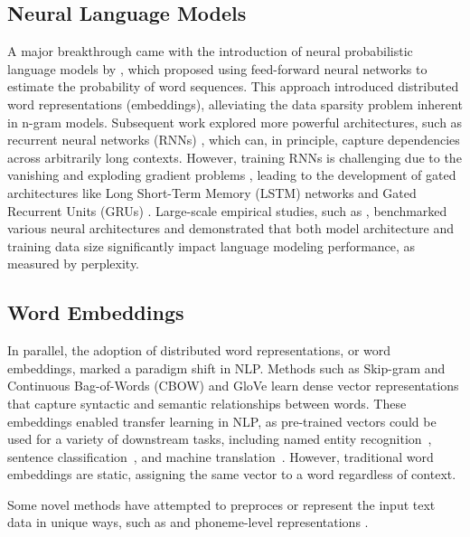 \subsection{Neural Language Models}

A major breakthrough came with the introduction of neural probabilistic language models by \cite{bengio2003neural}, which proposed using feed-forward neural networks to estimate the probability of word sequences. This approach introduced distributed word representations (embeddings), alleviating the data sparsity problem inherent in n-gram models. Subsequent work explored more powerful architectures, such as recurrent neural networks (RNNs) \citep{mikolov2010recurrent}, which can, in principle, capture dependencies across arbitrarily long contexts. However, training RNNs is challenging due to the vanishing and exploding gradient problems \citep{bengio1994learning}, leading to the development of gated architectures like Long Short-Term Memory (LSTM) networks \citep{hochreiter1997lstm} and Gated Recurrent Units (GRUs) \citep{cho2014gru}.
Large-scale empirical studies, such as \cite{jozefowicz2016exploring}, benchmarked various neural architectures and demonstrated that both model architecture and training data size significantly impact language modeling performance, as measured by perplexity.
\subsection{Word Embeddings}
In parallel, the adoption of distributed word representations, or word embeddings, marked a paradigm shift in NLP. Methods such as Skip-gram and Continuous Bag-of-Words (CBOW) \citep{mikolov2013efficient, mikolov2013distributed} and GloVe \citep{pennington2014glove} learn dense vector representations that capture syntactic and semantic relationships between words. These embeddings enabled transfer learning in NLP, as pre-trained vectors could be used for a variety of downstream tasks, including named entity recognition~\citep{lample2016neural}, sentence classification~\citep{kim2014convolutional}, and machine translation~\citep{qi2018translation}. However, traditional word embeddings are static, assigning the same vector to a word regardless of context.

Some novel methods have attempted to preproces or represent the input text data in unique ways, such as \cite{kim2016character} and phoneme-level representations \cite{goriely2024babble}.

